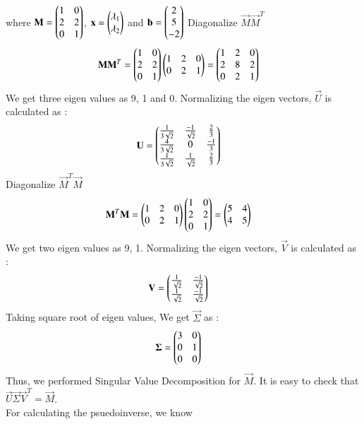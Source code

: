 where $\mathbf{M} = \begin{pmatrix}1 & 0\\2 & 2\\0 & 1\end{pmatrix}$, $\mathbf{x}= \begin{pmatrix}\lambda_1 \\ \lambda_2\end{pmatrix}$ and $\mathbf{b}=\begin{pmatrix}2\\5\\-2\end{pmatrix}$
Diagonalize $\vec{M}\vec{M}^T$
\begin{align}
	\mathbf{M}\mathbf{M}^T &= \begin{pmatrix}1 & 0\\2 & 2\\0 & 1\end{pmatrix} \begin{pmatrix}1 & 2 & 0\\0 & 2 & 1\end{pmatrix} = \begin{pmatrix}1 & 2 & 0\\2 & 8 & 2\\ 0 & 2 & 1\end{pmatrix} 
\end{align}
We get three eigen values as 9, 1 and 0. Normalizing the eigen vectors, $\vec{U}$ is calculated as : 
\begin{align}
	\mathbf{U} &= \begin{pmatrix}\frac{1}{3\sqrt{2}} & \frac{-1}{\sqrt{2}} & \frac{2}{3} \\ \frac{4}{3\sqrt{2}} & 0 & \frac{-1}{3} \\ \frac{1}{3\sqrt{2}} & \frac{1}{\sqrt{2}} & \frac{2}{3}\end{pmatrix}  
\end{align}
Diagonalize $\vec{M}^T\vec{M}$
\begin{align}
	\label{eq:solutions/4/48/5/e14}\mathbf{M}^T\mathbf{M} &= \begin{pmatrix}1 & 2 & 0\\0 & 2 & 1\end{pmatrix}\begin{pmatrix}1 & 0\\2 & 2\\0 & 1\end{pmatrix} = \begin{pmatrix}5 & 4\\4 & 5\end{pmatrix}
\end{align}
We get two eigen values as 9, 1. Normalizing the eigen vectors, $\vec{V}$ is calculated as : 
\begin{align}
	\mathbf{V} &= \begin{pmatrix}\frac{1}{\sqrt{2}} & \frac{-1}{\sqrt{2}} \\
	\frac{1}{\sqrt{2}} & \frac{-1}{\sqrt{2}}\end{pmatrix}  
\end{align}
Taking square root of eigen values, We get $\vec{\Sigma}$ as :
\begin{align}
	\mathbf{\Sigma} &= \begin{pmatrix}3 & 0\\0 & 1\\0 & 0\end{pmatrix}
\end{align}
Thus, we performed Singular Value Decomposition for $\vec{M}$. It is easy to check that $\vec{U}\vec{\Sigma}\vec{V}^T = \vec{M}$. \\
For calculating the psuedoinverse, we know 
